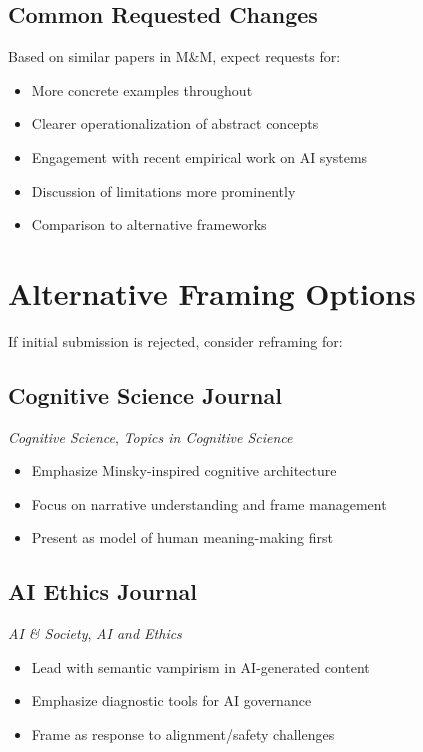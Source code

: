 \documentclass[12pt]{article}
\begin{document}
\subsection{Common Requested Changes}

Based on similar papers in M\&M, expect requests for:
\begin{itemize}[leftmargin=*]
\item More concrete examples throughout
\item Clearer operationalization of abstract concepts
\item Engagement with recent empirical work on AI systems
\item Discussion of limitations more prominently
\item Comparison to alternative frameworks
\end{itemize}

\section{Alternative Framing Options}

If initial submission is rejected, consider reframing for:

\subsection{Cognitive Science Journal}

\textit{Cognitive Science}, \textit{Topics in Cognitive Science}
\begin{itemize}
\item Emphasize Minsky-inspired cognitive architecture
\item Focus on narrative understanding and frame management
\item Present as model of human meaning-making first
\end{itemize}

\subsection{AI Ethics Journal}

\textit{AI \& Society}, \textit{AI and Ethics}
\begin{itemize}
\item Lead with semantic vampirism in AI-generated content
\item Emphasize diagnostic tools for AI governance
\item Frame as response to alignment/safety challenges
\end{itemize}
\end{document}
